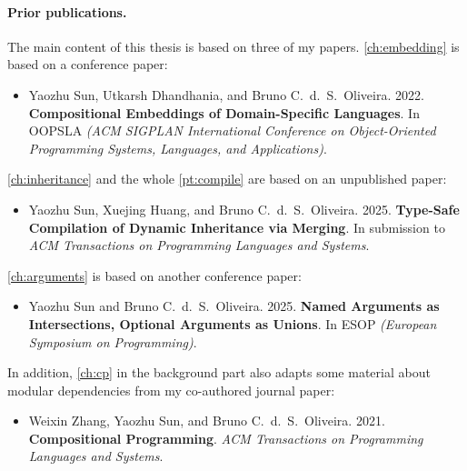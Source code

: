 \paragraph{Prior publications.}
The main content of this thesis is based on three of my papers.
\autoref{ch:embedding} is based on a conference paper:
\begin{itemize}
\item Yaozhu Sun, Utkarsh Dhandhania, and Bruno C.~d.~S.~Oliveira. 2022.
\textbf{Compositional Embeddings of Domain-Specific Languages}. In OOPSLA
\textit{(ACM SIGPLAN International Conference on Object-Oriented Programming
Systems, Languages, and Applications)}.
\end{itemize}
\autoref{ch:inheritance} and the whole \autoref{pt:compile} are based on an
unpublished paper:
\begin{itemize}
\item Yaozhu Sun, Xuejing Huang, and Bruno C.~d.~S.~Oliveira. 2025.
\textbf{Type-Safe Compilation of Dynamic Inheritance via Merging}.
In submission to \textit{ACM Transactions on Programming Languages and Systems}.
\end{itemize}
\autoref{ch:arguments} is based on another conference paper:
\begin{itemize}
\item Yaozhu Sun and Bruno C.~d.~S.~Oliveira. 2025.
\textbf{Named Arguments as Intersections, Optional Arguments as Unions}.
In ESOP \textit{(European Symposium on Programming)}.
\end{itemize}
In addition, \autoref{ch:cp} in the background part also adapts some material
about modular dependencies from my co-authored journal paper:
\begin{itemize}
\item Weixin Zhang, Yaozhu Sun, and Bruno C.~d.~S.~Oliveira. 2021.
\textbf{Compositional Programming}. \textit{ACM Transactions on Programming
Languages and Systems}.
\end{itemize}
